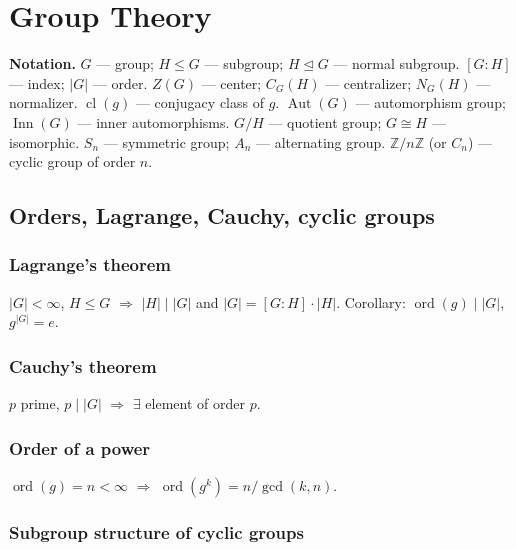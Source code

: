 \chapter{Group Theory}
\label{ch:groups}

\medskip

\textbf{Notation.} $G$ --- group; $H\le G$ --- subgroup; $H\trianglelefteq G$ --- normal subgroup.
$[G:H]$ --- index; $|G|$ --- order.
$Z(G)$ --- center; $C_G(H)$ --- centralizer; $N_G(H)$ --- normalizer.
$\operatorname{cl}(g)$ --- conjugacy class of $g$.
$\operatorname{Aut}(G)$ --- automorphism group; $\operatorname{Inn}(G)$ --- inner automorphisms.
$G/H$ --- quotient group; $G\cong H$ --- isomorphic.
$S_n$ --- symmetric group; $A_n$ --- alternating group.
$\mathbb{Z}/n\mathbb{Z}$ (or $C_n$) --- cyclic group of order $n$.

\medskip

\section{Orders, Lagrange, Cauchy, cyclic groups}
\label{sec:groups-orders}

\subsection{Lagrange's theorem}
\label{subsec:lagrange}

$|G|<\infty$, $H\le G$ $\Rightarrow$ $|H|\mid|G|$ and $|G|=[G:H]\cdot|H|$. Corollary: $\operatorname{ord}(g)\mid|G|$, $g^{|G|}=e$.

\subsection{Cauchy's theorem}
\label{subsec:cauchy-group}

$p$ prime, $p\mid|G|$ $\Rightarrow$ $\exists$ element of order $p$.

\subsection{Order of a power}
\label{subsec:order-power}

$\operatorname{ord}(g)=n<\infty$ $\Rightarrow$ $\operatorname{ord}(g^k)=n/\gcd(k,n)$.

\subsection{Subgroup structure of cyclic groups}
\label{subsec:cyclic-subgroups}

